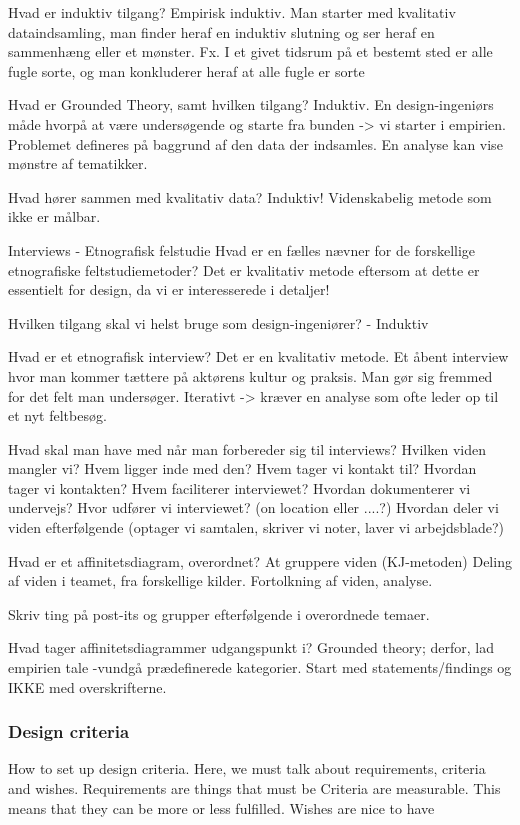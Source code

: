 Hvad er induktiv tilgang?
Empirisk induktiv. Man starter med kvalitativ dataindsamling, man finder heraf en induktiv slutning og ser heraf en sammenhæng eller et mønster.
Fx. I et givet tidsrum på et bestemt sted er alle fugle sorte, og man konkluderer heraf at alle fugle er sorte

Hvad er Grounded Theory, samt hvilken tilgang?
Induktiv. En design-ingeniørs måde hvorpå at være undersøgende og starte fra bunden -> vi starter i empirien.
Problemet defineres på baggrund af den data der indsamles. En analyse kan vise mønstre af tematikker.

Hvad hører sammen med kvalitativ data?
Induktiv! Videnskabelig metode som ikke er målbar.

Interviews - Etnografisk felstudie
Hvad er en fælles nævner for de forskellige etnografiske feltstudiemetoder?
Det er kvalitativ metode eftersom at dette er essentielt for design, da vi er interesserede i detaljer!

Hvilken tilgang skal vi helst bruge som design-ingeniører? - Induktiv

Hvad er et etnografisk interview?
Det er en kvalitativ metode.
Et åbent interview hvor man kommer tættere på aktørens kultur og praksis.
Man gør sig fremmed for det felt man undersøger.
Iterativt -> kræver en analyse som ofte leder op til et nyt feltbesøg.

Hvad skal man have med når man forbereder sig til interviews?
Hvilken viden mangler vi?
Hvem ligger inde med den?
Hvem tager vi kontakt til? Hvordan tager vi kontakten?
Hvem faciliterer interviewet?
Hvordan dokumenterer vi undervejs?
Hvor udfører vi interviewet? (on location eller ....?)
Hvordan deler vi viden efterfølgende (optager vi samtalen, skriver vi noter, laver vi arbejdsblade?)

Hvad er et affinitetsdiagram, overordnet?
At gruppere viden (KJ-metoden)
Deling af viden i teamet, fra forskellige kilder.
Fortolkning af viden, analyse.

Skriv ting på post-its og grupper efterfølgende i overordnede temaer.

Hvad tager affinitetsdiagrammer udgangspunkt i?
Grounded theory; derfor, lad empirien tale -vundgå prædefinerede kategorier.
Start med statements/findings og IKKE med overskrifterne.

\subsubsection{Design criteria}
How to set up design criteria.
Here, we must talk about requirements, criteria and wishes.
Requirements are things that must be
Criteria are measurable. This means that they can be more or less fulfilled.
Wishes are nice to have


